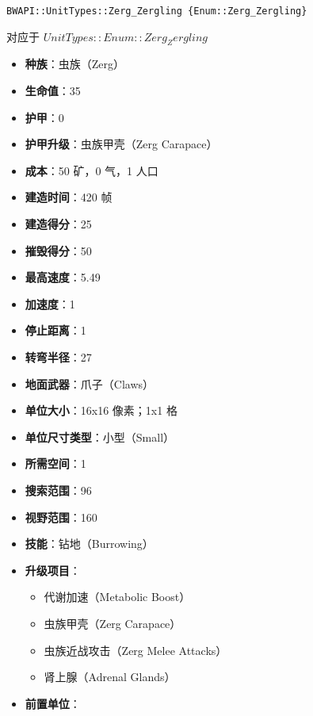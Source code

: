 \begin{tcolorbox}[colback=white, colframe=black!60!white, title=Zerg\_Zergling(), arc=0mm]
    \begin{verbatim}
BWAPI::UnitTypes::Zerg_Zergling {Enum::Zerg_Zergling}
    \end{verbatim}
    对应于  $ UnitTypes::Enum::Zerg_Zergling $ 
    \begin{itemize}
        \item \textbf{种族}：虫族（Zerg）
        \item \textbf{生命值}：35
        \item \textbf{护甲}：0
        \item \textbf{护甲升级}：虫族甲壳（Zerg Carapace）
        \item \textbf{成本}：50 矿，0 气，1 人口
        \item \textbf{建造时间}：420 帧
        \item \textbf{建造得分}：25
        \item \textbf{摧毁得分}：50
        \item \textbf{最高速度}：5.49
        \item \textbf{加速度}：1
        \item \textbf{停止距离}：1
        \item \textbf{转弯半径}：27
        \item \textbf{地面武器}：爪子（Claws）
        \item \textbf{单位大小}：16x16 像素；1x1 格
        \item \textbf{单位尺寸类型}：小型（Small）
        \item \textbf{所需空间}：1
        \item \textbf{搜索范围}：96
        \item \textbf{视野范围}：160
        \item \textbf{技能}：钻地（Burrowing）
        \item \textbf{升级项目}：
            \begin{itemize}
                \item 代谢加速（Metabolic Boost）
                \item 虫族甲壳（Zerg Carapace）
                \item 虫族近战攻击（Zerg Melee Attacks）
                \item 肾上腺（Adrenal Glands）
            \end{itemize}
        \item \textbf{前置单位}：

\end{itemize}
\end{tcolorbox}
